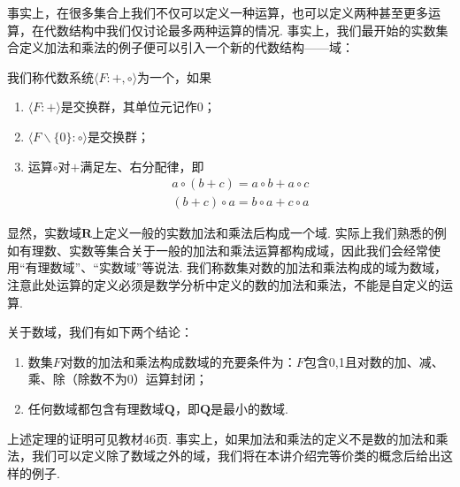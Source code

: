 事实上，在很多集合上我们不仅可以定义一种运算，也可以定义两种甚至更多运算，在代数结构中我们仅讨论最多两种运算的情况. 事实上，我们最开始的实数集合定义加法和乘法的例子便可以引入一个新的代数结构——域：
\begin{definition}[域] 
    我们称代数系统$\langle F:+,\circ\rangle$为一个，如果
    \begin{enumerate}
        \item $\langle F:+\rangle$是交换群，其单位元记作0；

        \item $\langle F\backslash\{0\}:\circ\rangle$是交换群；

        \item 运算$\circ$对$+$满足左、右分配律，即
              \begin{gather*}
                  a\circ(b+c)=a\circ b+a\circ c \\
                  (b+c)\circ a=b\circ a+c\circ a
              \end{gather*}
    \end{enumerate}
\end{definition}

显然，实数域$\mathbf{R}$上定义一般的实数加法和乘法后构成一个域. 实际上我们熟悉的例如有理数、实数等集合关于一般的加法和乘法运算都构成域，因此我们会经常使用``有理数域''、``实数域''等说法. 我们称数集对数的加法和乘法构成的域为数域，注意此处运算的定义必须是数学分析中定义的数的加法和乘法，不能是自定义的运算.
\begin{theorem}
    关于数域，我们有如下两个结论：
    \begin{enumerate}
        \item 数集$F$对数的加法和乘法构成数域的充要条件为：$F$包含0,1且对数的加、减、乘、除（除数不为0）运算封闭；

        \item 任何数域都包含有理数域$\mathbf{Q}$，即$\mathbf{Q}$是最小的数域.
    \end{enumerate}
\end{theorem}

上述定理的证明可见教材46页. 事实上，如果加法和乘法的定义不是数的加法和乘法，我们可以定义除了数域之外的域，我们将在本讲介绍完等价类的概念后给出这样的例子.

